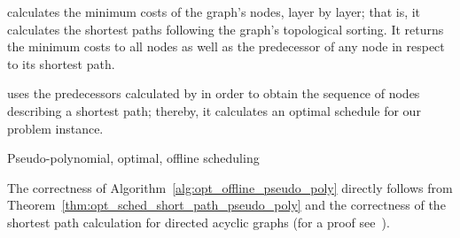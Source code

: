  calculates the minimum costs of the graph's nodes, layer by layer; that is, it calculates the shortest paths following the graph's topological sorting. It returns the minimum costs to all nodes as well as the predecessor of any node in respect to its shortest path.

 uses the predecessors calculated by  in order to obtain the sequence of nodes describing a shortest path; thereby, it calculates an optimal schedule for our problem instance.
\begin{algorithm}[H]
  \caption{Pseudo-polynomial, optimal, offline scheduling}
  \begin{algorithmic}[1]
	  \State \Return{$\mx$}
  \EndFunction
  \Statex
	\EndFor
		\EndFor
	\EndFor
	\State {}
  \EndFunction
  \Statex
	\EndFor
	\State \Return{$\mx$}
  \EndFunction
  \end{algorithmic}
\label{alg:opt_offline_pseudo_poly}
\end{algorithm}
The correctness of Algorithm~\ref{alg:opt_offline_pseudo_poly} directly follows from Theorem~\ref{thm:opt_sched_short_path_pseudo_poly} and the correctness of the shortest path calculation for directed acyclic graphs (for a proof see~\parencite{intro-algo}).

